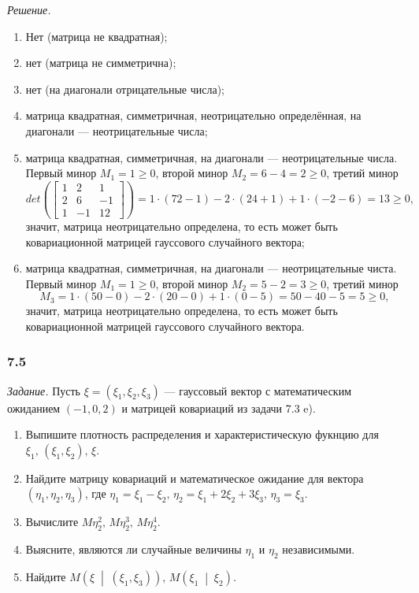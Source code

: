 \textit{Решение.}
\begin{enumerate}[label=\alph*)]
  \item Нет (матрица не квадратная);
  \item нет (матрица не симметрична);
  \item нет (на диагонали отрицательные числа);
  \item матрица квадратная, симметричная, неотрицательно определённая, на диагонали ---
  неотрицательные числа;
  \item матрица квадратная, симметричная, на диагонали --- неотрицательные числа.
  Первый минор $M_1 = 1 \geq 0$, второй минор $M_2 = 6 - 4 = 2 \geq 0$, третий минор
  $$det \left(
      \begin{bmatrix}
        1 & 2 & 1 \\
        2 & 6 & -1 \\
        1 & -1 & 12
      \end{bmatrix}
    \right) =
    1 \cdot \left( 72 - 1 \right) - 2 \cdot \left( 24 + 1 \right) + 1 \cdot \left( -2 - 6 \right) =
    13 \geq
    0,$$
  значит, матрица неотрицательно определена,
  то есть может быть ковариационной матрицей гауссового случайного вектора;
  \item матрица квадратная, симметричная, на диагонали --- неотрицательные чиста.
  Первый минор $M_1 = 1 \geq 0$, второй минор $M_2 = 5 - 2 = 3 \geq 0$,
  третий минор
  $$M_3 =
    1 \cdot \left( 50 - 0 \right) - 2 \cdot \left( 20 - 0 \right) + 1 \cdot \left( 0 - 5 \right) =
    50 - 40 - 5 =
    5 \geq
    0,$$
  значит, матрица неотрицательно определена,
  то есть может быть ковариационной матрицей гауссового случайного вектора.
\end{enumerate}

\subsubsection*{7.5}

\textit{Задание.}
Пусть $ \xi = \left( \xi_1, \xi_2, \xi_3 \right) $ ---
гауссовый вектор с математическим ожиданием $ \left( -1, 0, 2 \right) $
и матрицей ковариаций из задачи 7.3 e).
\begin{enumerate}[label=\alph*)]
  \item Выпишите плотность распределения и характеристическую фукнцию для
  $ \xi_1, \,
    \left( \xi_1, \xi_2 \right), \,
    \xi $.
  \item Найдите матрицу ковариаций и математическое ожидание для вектора
  $ \left( \eta_1, \eta_2, \eta_3 \right) $,
  где $ \eta_1 = \xi_1 - \xi_2, \, \eta_2 = \xi_1 + 2 \xi_2 + 3 \xi_3, \, \eta_3 = \xi_3$.
  \item Вычислите $M \eta_2^2, \, M \eta_2^3, \, M \eta_2^4$.
  \item Выясните, являются ли случайные величины $ \eta_1$ и $ \eta_2$ независимыми.
  \item Найдите
  $M \left( \xi \; \middle| \; \left( \xi_1, \xi_3 \right) \right), \,
    M \left( \xi_1 \; \middle| \; \xi_2 \right) $.
\end{enumerate}


